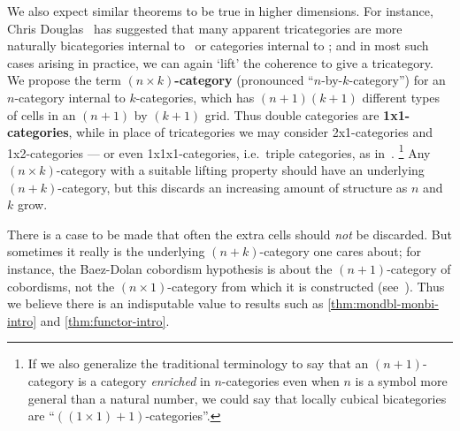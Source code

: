 \begin{rmk}
We also expect similar theorems to be true in higher dimensions.  For
instance, Chris Douglas~\cite{douglas:tfttalk} has suggested that many
apparent tricategories are more naturally bicategories internal to
\cCat\ or categories internal to \cTwocat; and in most such cases
arising in practice, we can again `lift' the coherence to give a
tricategory.
%
We propose the term \textbf{$(n\times k)$-category}
(pronounced ``$n$-by-$k$-category'') for an $n$-category internal to
$k$-categories, which has $(n+1)(k+1)$ different types of
cells in an $(n+1)$ by $(k+1)$ grid.  Thus
double categories are \textbf{1x1-categories}, while in
place of tricategories we may consider 2x1-categories and
1x2-categories --- or even 1x1x1-categories, i.e.\ triple categories,
as in~\cite{gp:intercategories-i,gp:intercategories-ii}.%
\footnote{If we also generalize the traditional terminology to say that an $(n+1)$-category is a category \emph{enriched} in $n$-categories even when $n$ is a symbol more general than a natural number, we could say that locally cubical bicategories are ``$((1\times 1)+1)$-categories''.}
Any
$(n\times k)$-category with a suitable lifting property
should have an underlying $(n+k)$-category, but this discards an increasing amount of structure as $n$ and $k$ grow.


There is a case to be made that often the extra cells should
\emph{not} be discarded.  But sometimes
it really is the underlying $(n+k)$-category one cares about; for
instance, the Baez-Dolan cobordism hypothesis is about the $(n+1)$-category of cobordisms, not
the $(n\times 1)$-category from which it is constructed
(see~\cite{lurie:tft}).  Thus we believe there is an indisputable value to
results such as \autoref{thm:mondbl-monbi-intro} and \autoref{thm:functor-intro}.
\end{rmk}

